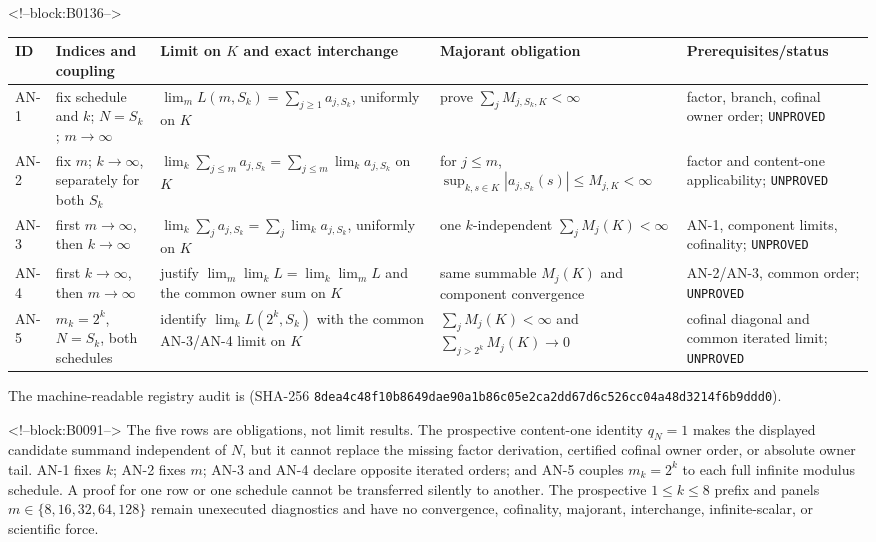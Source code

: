 \documentclass[11pt]{article}
\begin{document}
<!--block:B0136-->
\begin{center}
\scriptsize
\begin{tabular}{@{}p{.06\linewidth}p{.17\linewidth}p{.25\linewidth}p{.23\linewidth}p{.17\linewidth}@{}}
\toprule
ID & Indices and coupling & Limit on \(K\) and exact interchange & Majorant obligation & Prerequisites/status \\
\midrule
AN-1 & fix schedule and \(k\); \(N=S_k\); \(m\to\infty\) & \(\lim_m L(m,S_k)=\sum_{j\geq1}a_{j,S_k}\), uniformly on \(K\) & prove \(\sum_jM_{j,S_k,K}<\infty\) & factor, branch, cofinal owner order; \texttt{UNPROVED} \\
AN-2 & fix \(m\); \(k\to\infty\), separately for both \(S_k\) & \(\lim_k\sum_{j\leq m}a_{j,S_k}=\sum_{j\leq m}\lim_ka_{j,S_k}\) on \(K\) & for \(j\leq m\), \(\sup_{k,s\in K}|a_{j,S_k}(s)|\leq M_{j,K}<\infty\) & factor and content-one applicability; \texttt{UNPROVED} \\
AN-3 & first \(m\to\infty\), then \(k\to\infty\) & \(\lim_k\sum_ja_{j,S_k}=\sum_j\lim_ka_{j,S_k}\), uniformly on \(K\) & one \(k\)-independent \(\sum_jM_j(K)<\infty\) & AN-1, component limits, cofinality; \texttt{UNPROVED} \\
AN-4 & first \(k\to\infty\), then \(m\to\infty\) & justify \(\lim_m\lim_kL=\lim_k\lim_mL\) and the common owner sum on \(K\) & same summable \(M_j(K)\) and component convergence & AN-2/AN-3, common order; \texttt{UNPROVED} \\
AN-5 & \(m_k=2^k\), \(N=S_k\), both schedules & identify \(\lim_kL(2^k,S_k)\) with the common AN-3/AN-4 limit on \(K\) & \(\sum_jM_j(K)<\infty\) and \(\sum_{j>2^k}M_j(K)\to0\) & cofinal diagonal and common iterated limit; \texttt{UNPROVED} \\
\bottomrule
\end{tabular}
\end{center}
The machine-readable registry audit is
 (SHA-256
\texttt{8dea4c48\allowbreak{}f10b8649\allowbreak{}dae90a1b\allowbreak{}86c05e2c\allowbreak{}a2dd67d6\allowbreak{}c526cc04\allowbreak{}a48d3214\allowbreak{}f6b9ddd0}).

<!--block:B0091-->
The five rows are obligations, not limit results.  The prospective
content-one identity \(q_N=1\) makes the displayed candidate summand independent
of \(N\), but it cannot replace the missing factor derivation, certified cofinal
owner order, or absolute owner tail.  AN-1 fixes \(k\); AN-2 fixes \(m\);
AN-3 and AN-4 declare opposite iterated orders; and AN-5 couples
\(m_k=2^k\) to each full infinite modulus schedule.  A proof for one row or one
schedule cannot be transferred silently to another.  The prospective
\(1\leq k\leq8\) prefix and panels
\(m\in\{8,16,32,64,128\}\) remain unexecuted diagnostics and have no
convergence, cofinality, majorant, interchange, infinite-scalar, or scientific
force.
\end{document}
